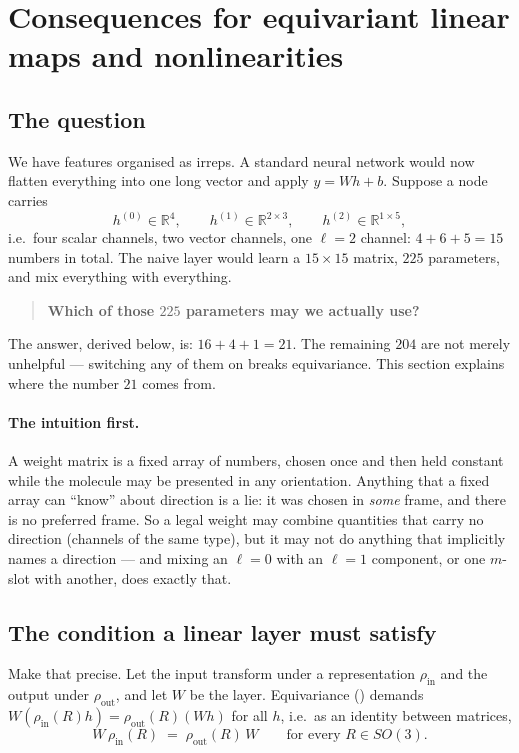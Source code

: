 \documentclass[11pt,a4paper]{report}
\theoremstyle{definition}
\theoremstyle{remark}
\newcommand{\RR}{\mathbb R}
\begin{document}
\section{Consequences for equivariant linear maps and nonlinearities}
\label{sec:equivariant-layers}
\label{sec:schur-consequences}

\subsection{The question}
\label{sec:linear-question}

We have features organised as irreps. A standard neural network would now
flatten everything into one long vector and apply $y=Wh+b$. Suppose a node
carries
\[
h^{(0)}\in\RR^{4},\qquad h^{(1)}\in\RR^{2\times3},\qquad h^{(2)}\in\RR^{1\times5},
\]
i.e.\ four scalar channels, two vector channels, one $\ell=2$ channel:
$4+6+5=15$ numbers in total. The naive layer would learn a $15\times15$
matrix, $225$ parameters, and mix everything with everything.

\begin{quote}
\textbf{Which of those $225$ parameters may we actually use?}
\end{quote}

The answer, derived below, is: $16+4+1=21$. The remaining $204$ are not
merely unhelpful --- switching any of them on breaks equivariance. This
section explains where the number $21$ comes from.

\paragraph{The intuition first.} A weight matrix is a fixed array of
numbers, chosen once and then held constant while the molecule may be
presented in any orientation. Anything that a fixed array can ``know'' about
direction is a lie: it was chosen in \emph{some} frame, and there is no
preferred frame. So a legal weight may combine quantities that carry no
direction (channels of the same type), but it may not do anything that
implicitly names a direction --- and mixing an $\ell=0$ with an $\ell=1$
component, or one $m$-slot with another, does exactly that.

\subsection{The condition a linear layer must satisfy}
\label{sec:intertwiner-condition}

Make that precise. Let the input transform under a representation
$\rho_{\mathrm{in}}$ and the output under $\rho_{\mathrm{out}}$, and let
$W$ be the layer. Equivariance () demands
$W(\rho_{\mathrm{in}}(R)h)=\rho_{\mathrm{out}}(R)(Wh)$ for all $h$, i.e.\ as
an identity between matrices,
\begin{equation}
\label{eq:intertwiner-condition}
\boxed{\;W\,\rho_{\mathrm{in}}(R) \;=\; \rho_{\mathrm{out}}(R)\,W
\qquad\text{for every } R\in SO(3). \;}
\end{equation}
\end{document}
